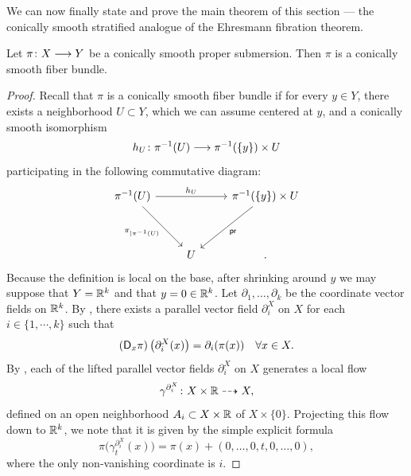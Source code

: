 We can now finally state and prove the main theorem of this section — the conically smooth stratified analogue of the Ehresmann fibration theorem. 

\begin{theorem}\label{ch4:: thm : stratified ehresmann}
    Let $\pi\colon X \longrightarrow Y$ be a conically smooth proper submersion. Then $\pi$ is a conically smooth fiber bundle.
\end{theorem}
\begin{proof}
Recall that $\pi$ is a conically smooth fiber bundle if for every $y\in Y$, there exists a neighborhood $U\subset Y$, which we can assume centered at $y$, and a conically smooth isomorphism
\begin{equation}
    h_U\colon \pi^{-1}(U) \longrightarrow \pi^{-1}(\{y\})\times U
\end{equation}
participating in the following commutative diagram: 
\begin{equation}\label{eq:thm:Ehresmann}
\begin{tikzcd}[ampersand replacement=\&]
	{\pi^{-1}(U)} \&\& {\pi^{-1}(\{y\})\times U} \\
	\\
	\& U \& {.}
	\arrow["{h_U}", from=1-1, to=1-3]
	\arrow["{\pi_{|\pi^{-1}(U)}}"', from=1-1, to=3-2]
	\arrow["{{\sf pr}}", from=1-3, to=3-2]
\end{tikzcd}
\end{equation}
Because the definition is local on the base, after shrinking around $y$ we may suppose that $Y=\mathbb R^k$ and that $y=0\in \mathbb R^k$. Let $\partial_1,\ldots, \partial_k$ be the coordinate vector fields on $\mathbb R^k$. By , there exists a parallel vector field $\partial_{i}^X$ on $X$ for each $i\in \{1,\cdots, k\}$ such that 
\begin{equation}\label{eq:thm:str_ehrs:prf:lift}
    (\mathsf D_{x}\pi)\,\big(\partial^X_{i}(x)\big)= \partial_{i}(\pi(x)) \quad \forall x\in X. 
\end{equation}
By , each of the lifted parallel vector fields $\partial^X_{i}$ on $X$ generates a local flow 
\begin{equation}\label{eq:thm:prf:flow}
\gamma^{\partial^X_{i}}\colon X \times \mathbb R \dashrightarrow X,
\end{equation} defined on an open neighborhood $A_i \subset X\times \mathbb R$ of $X\times \{0\}.$ Projecting this flow down to $\mathbb R^k$, we note that it is given by the simple explicit formula
\begin{equation}
    \pi\big(\gamma^{\partial^{X}_{i}}_{t}(x)\big) = \pi(x) + (0,\ldots,0,t,0,\ldots,0),
\end{equation} where the only non-vanishing coordinate is $i$. 


\end{proof}
